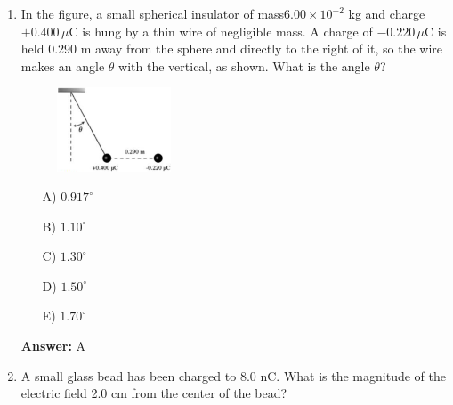 \begin{enumerate}
    \begin{multicols}{5}
    \begin{itemize}
        \item[A)] $1.9\times10^{-4}$ N
        \item[B)] $1.2\times10^{-4}$ N
        \item[C)] $1.6\times10^{-4}$ N
        \item[D)] $2.3\times10^{-4}$ N
    \end{itemize}
    \end{multicols}

    \textbf{Answer:} A

    \item In the figure, a small spherical insulator of mass$ 6.00 \times 10^{-2}$ kg and charge $+0.400 \,\mu$C is hung by a thin wire of negligible mass. A charge of $-0.220\,\mu$C is held 0.290 m away from the sphere and directly to the right of it, so the wire makes an angle $\theta$ with the vertical, as shown. What is the angle $\theta$?

    \begin{figure}[H]
        \centering
        \includegraphics[width=0.32\textwidth]{figures-workshop01/problem-8.png}
    \end{figure}

    \begin{multicols}{5}
    \begin{itemize}
        \item[A)] $0.917^\circ$
        \item[B)] $1.10^\circ$
        \item[C)] $1.30^\circ$
        \item[D)] $1.50^\circ$
        \item[E)] $1.70^\circ$
    \end{itemize}
    \end{multicols}

    \textbf{Answer:} A

    \item A small glass bead has been charged to 8.0 nC. What is the magnitude of the electric field 2.0 cm from the center of the bead?


\end{enumerate}
